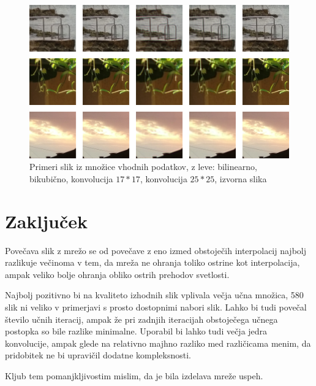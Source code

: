 \documentclass[a4paper,11pt]{article}
\begin{document}
\begin{figure}[htbp]
\begin{center}
\includegraphics[scale=0.231]{picture_comparison.jpg}
\caption{Primeri slik iz množice vhodnih podatkov, z leve: bilinearno, bikubično, konvolucija $17 * 17$, konvolucija $25 * 25$, izvorna slika}
\label{slika1}
\end{center}
\end{figure}

\section{Zaključek}

Povečava slik z mrežo se od povečave z eno izmed obstoječih interpolacij najbolj razlikuje večinoma v tem, da mreža ne ohranja toliko ostrine kot 
	interpolacija, ampak veliko bolje ohranja obliko ostrih prehodov svetlosti.

Najbolj pozitivno bi na kvaliteto izhodnih slik vplivala večja učna množica, 580 slik ni veliko v primerjavi s prosto dostopnimi nabori
	slik.\cite{datasets}
Lahko bi tudi povečal število učnih iteracij, ampak že pri zadnjih iteracijah obstoječega učnega postopka so bile razlike minimalne.
Uporabil bi lahko tudi večja jedra konvolucije, ampak glede na relativno majhno razliko med različicama menim, da pridobitek ne bi upravičil dodatne
	kompleksnosti.

Kljub tem pomanjkljivostim mislim, da je bila izdelava mreže uspeh.
\end{document}
